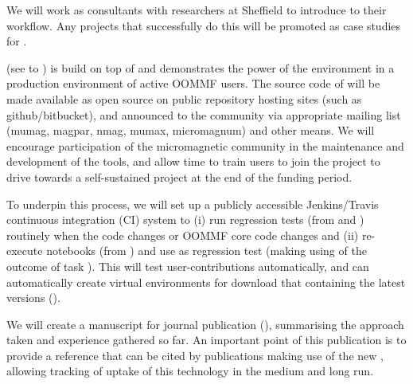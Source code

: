 \begin{workpackage}[id=dissem,wphases=18-48!.5,
  title=Dissemination,
  SARM=9,
  USORM=11,
  USHRM=8,
  USRM=24,
  UVRM=2
]
\begin{tasklist}
\begin{task}[title=Introduce \TheProject to researchers and teachers]
We will work as consultants with researchers at Sheffield to introduce \TheProject to their workflow. Any projects that successfully do this will be promoted as case studies for \TheProject.
\end{task}

\begin{task}[id=dissemination-of-oommf-nb-virtual-environment,
  title=Demonstrator: Open source dissemination of \OOMMFNB{} virtual environment]
  \OOMMFNB{} (see  to
  ) is build on top of \TheProject and demonstrates the power
  of the environment in a production environment of active OOMMF users. 
  The source code of \OOMMFNB{} will be made available as open source on
  public repository hosting sites (such as github/bitbucket), and
  announced to the community via appropriate mailing list (mumag,
  magpar, nmag, mumax, micromagnum) and other means. We will
  encourage participation of the micromagnetic community in the
  maintenance and development of the tools, and allow time to train
  users to join the \OOMMFNB{} project to drive towards a self-sustained
  \OOMMFNB{} project at the end of the funding period.

  To underpin this process, we will set up a publicly accessible
  Jenkins/Travis continuous integration (CI) system to (i) run
  regression tests (from  and ) routinely when the
  \OOMMFNB{} code changes or OOMMF core code changes and (ii)
  re-execute notebooks (from
  ) and use
  as regression test (making using of the outcome of task ). This will
  test user-contributions automatically, and can automatically create virtual environments
  for download that containing the latest versions ().

  We will create a manuscript for journal publication (), summarising the
  approach taken and experience gathered so far. An important point of
  this publication is to provide a reference that can be cited by
  publications making use of the new \OOMMFNB, allowing tracking of
  uptake of this technology in the medium and long run.
\end{task}

\begin{task}[title=\OOMMFNB{} open source dissemination workshops,
id=dissemination-of-oommf-nb-workshops]


\end{task}
\end{tasklist}
\end{workpackage}
